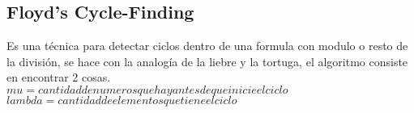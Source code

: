 \subsection{Floyd’s Cycle-Finding}
Es una técnica para detectar ciclos dentro de una formula con modulo o resto de la división, se hace con la analogía de la liebre y la tortuga, el algoritmo consiste en encontrar 2 cosas.
\\$mu= cantidad de numeros que hay antes de que inicie el ciclo$
\\$lambda =cantidad de elementos que tiene el ciclo$
